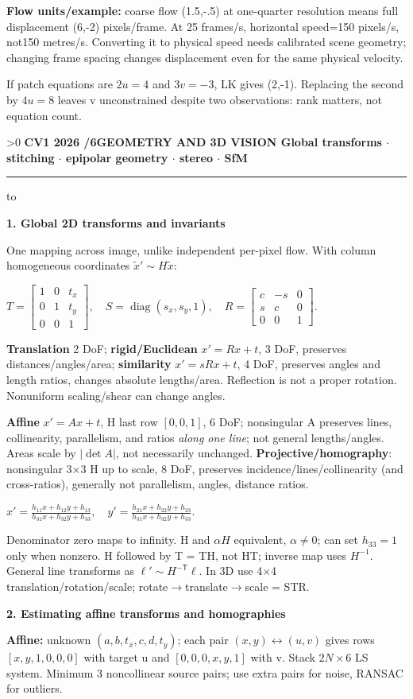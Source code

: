 \documentclass[a4paper]{article}
\newcommand{\key}[1]{\textbf{#1}}
\newcommand{\Topic}[1]{\par\vspace{1.7pt}\noindent
  {\fontsize{7.7}{8.0}\selectfont\bfseries #1}\par\vspace{0.3pt}}
\newcommand{\eq}[1]{\par\noindent\mbox{\(\displaystyle #1\)}\par}
\newcommand{\smat}[1]{\left[\begin{smallmatrix}#1\end{smallmatrix}\right]}
\newcommand{\inv}{^{-1}}
\newcommand{\diag}{\operatorname{diag}}
\newcounter{sheet}
\newcounter{sheetcolumn}
\newlength{\colwidth}
\newcommand{\Sheet}[2]{\ifnum\value{sheet}>0\newpage\fi
  \stepcounter{sheet}\setcounter{sheetcolumn}{0}
  {\fontsize{8.5}{9}\selectfont\bfseries CV1 2026 \quad \thesheet/6\quad #1
  \hfill {\fontsize{6.3}{7}\selectfont #2}}\par
  \vspace{-1pt}\hrule height 0.35pt\vspace{2pt}\noindent
  \hbox to\textwidth\bgroup\ignorespaces}
\newcommand{\EndSheet}{\unskip\egroup\par}
\newenvironment{sheetcol}[1][7.0]{\stepcounter{sheetcolumn}
  \begin{lrbox}{\columnbox}\begin{minipage}[t]{\colwidth}\vspace{0pt}
  \fontsize{#1}{\dimexpr#1pt+0.6pt\relax}\selectfont}
  {\end{minipage}\end{lrbox}
  \typeout{CV1COL|\thesheet|\thesheetcolumn|\the\dimexpr\ht\columnbox+\dp\columnbox\relax}
  \usebox{\columnbox}\ignorespacesafterend}
\begin{document}
\begin{sheetcol}
\key{Flow units/example:} coarse flow (1.5,-.5) at one-quarter resolution means full displacement (6,-2) pixels/frame. At 25 frames/s, horizontal speed=150 pixels/s, not150 metres/s. Converting it to physical speed needs calibrated scene geometry; changing frame spacing changes displacement even for the same physical velocity.

If patch equations are \(2u=4\) and \(3v=-3\), LK gives (2,-1). Replacing the second by \(4u=8\) leaves v unconstrained despite two observations: rank matters, not equation count.
\end{sheetcol}\EndSheet

\Sheet{GEOMETRY AND 3D VISION}{Global transforms \(\cdot\) stitching \(\cdot\) epipolar geometry \(\cdot\) stereo \(\cdot\) SfM}
\begin{sheetcol}[6.7]
\Topic{1. Global 2D transforms and invariants}
One mapping across image, unlike independent per-pixel flow. With column homogeneous coordinates \(\tilde x'\sim H\tilde x\):
\eq{T=\smat{1&0&t_x\\0&1&t_y\\0&0&1},\quad
 S=\diag(s_x,s_y,1),\quad
 R=\smat{c&-s&0\\s&c&0\\0&0&1}.}
\key{Translation} 2 DoF; \key{rigid/Euclidean} \(x'=Rx+t\), 3 DoF, preserves distances/angles/area; \key{similarity} \(x'=sRx+t\), 4 DoF, preserves angles and length ratios, changes absolute lengths/area. Reflection is not a proper rotation. Nonuniform scaling/shear can change angles.

\key{Affine} \(x'=Ax+t\), H last row \([0,0,1]\), 6 DoF; nonsingular A preserves lines, collinearity, parallelism, and ratios \emph{along one line}; not general lengths/angles. Areas scale by \(|\det A|\), not necessarily unchanged. \key{Projective/homography}: nonsingular 3\(\times\)3 H up to scale, 8 DoF, preserves incidence/lines/collinearity (and cross-ratios), generally not parallelism, angles, distance ratios.
\eq{x'=\frac{h_{11}x+h_{12}y+h_{13}}{h_{31}x+h_{32}y+h_{33}},\quad
 y'=\frac{h_{21}x+h_{22}y+h_{23}}{h_{31}x+h_{32}y+h_{33}}.}
Denominator zero maps to infinity. H and \(\alpha H\) equivalent, \(\alpha\ne0\); can set \(h_{33}=1\) only when nonzero. H followed by T = TH, not HT; inverse map uses \(H\inv\). General line transforms as \(\ell'\sim H^{-\mathsf T}\ell\). In 3D use 4\(\times\)4 translation/rotation/scale; rotate\(\to\)translate\(\to\)scale = STR.

\Topic{2. Estimating affine transforms and homographies}
\key{Affine:} unknown \((a,b,t_x,c,d,t_y)\); each pair \((x,y)\leftrightarrow(u,v)\) gives rows \([x,y,1,0,0,0]\) with target u and \([0,0,0,x,y,1]\) with v. Stack \(2N\!\times\!6\) LS system. Minimum 3 noncollinear source pairs; use extra pairs for noise, RANSAC for outliers.


\end{sheetcol}
\end{document}
